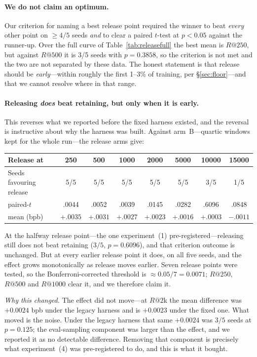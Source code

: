 \documentclass[11pt,a4paper]{article}
\begin{document}
\paragraph{We do not claim an optimum.} Our criterion for naming a best release point required the winner to beat \emph{every} other point on $\geq4/5$ seeds \emph{and} to clear a paired $t$-test at $p<0.05$ against the runner-up. Over the full curve of Table~\ref{tab:releasefull} the best mean is $R@250$, but against $R@500$ it is 3/5 seeds with $p=0.3858$, so the criterion is not met and the two are not separated by these data. The honest statement is that release should be \emph{early}---within roughly the first 1--3\% of training, per \S\ref{sec:floor}---and that we cannot resolve where in that range.

\paragraph{Releasing \emph{does} beat retaining, but only when it is early.} This reverses what we reported before the fixed harness existed, and the reversal is instructive about why the harness was built. Against arm~B---quartic windows kept for the whole run---the release arms give:

\begin{center}
\small
\begin{tabular}{lccccccc}
\toprule
Release at & 250 & 500 & 1000 & 2000 & 5000 & 10000 & 15000 \\
\midrule
Seeds favouring release & 5/5 & 5/5 & 5/5 & 5/5 & 5/5 & 3/5 & 1/5 \\
paired-$t$ & .0044 & .0052 & .0039 & .0145 & .0282 & .6096 & .0848 \\
mean (bpb) & $+.0035$ & $+.0031$ & $+.0027$ & $+.0023$ & $+.0016$ & $+.0003$ & $-.0011$ \\
\bottomrule
\end{tabular}
\end{center}

At the halfway release point---the one experiment~(1) pre-registered---releasing still does not beat retaining ($3/5$, $p=0.6096$), and that criterion outcome is unchanged. But at every earlier release point it does, on all five seeds, and the effect grows monotonically as release moves earlier. Seven release points were tested, so the Bonferroni-corrected threshold is ${\approx}0.05/7 = 0.0071$; $R@250$, $R@500$ and $R@1000$ clear it, and we therefore claim it.

\emph{Why this changed.} The effect did not move---at $R@2$k the mean difference was $+0.0024$ bpb under the legacy harness and is $+0.0023$ under the fixed one. What moved is the noise. Under the legacy harness that same $+0.0024$ was $3/5$ seeds at $p=0.125$; the eval-sampling component was larger than the effect, and we reported it as no detectable difference. Removing that component is precisely what experiment~(4) was pre-registered to do, and this is what it bought.
\end{document}
